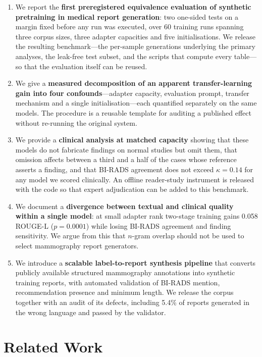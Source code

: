 \documentclass{wlscirep}
\begin{document}
\begin{enumerate}
  \item We report the \textbf{first preregistered equivalence evaluation of synthetic pretraining in medical report generation}: two one-sided tests on a margin fixed before any run was executed, over 60 training runs spanning three corpus sizes, three adapter capacities and five initialisations. We release the resulting benchmark---the per-sample generations underlying the primary analyses, the leak-free test subset, and the scripts that compute every table---so that the evaluation itself can be reused.
  \item We give a \textbf{measured decomposition of an apparent transfer-learning gain into four confounds}---adapter capacity, evaluation prompt, transfer mechanism and a single initialisation---each quantified separately on the same models. The procedure is a reusable template for auditing a published effect without re-running the original system.
  \item We provide a \textbf{clinical analysis at matched capacity} showing that these models do not fabricate findings on normal studies but omit them, that omission affects between a third and a half of the cases whose reference asserts a finding, and that BI-RADS agreement does not exceed $\kappa = 0.14$ for any model we scored clinically. An offline reader-study instrument is released with the code so that expert adjudication can be added to this benchmark.
  \item We document a \textbf{divergence between textual and clinical quality within a single model}: at small adapter rank two-stage training gains 0.058 ROUGE-L ($p=0.0001$) while losing BI-RADS agreement and finding sensitivity. We argue from this that $n$-gram overlap should not be used to select mammography report generators.
  \item We introduce a \textbf{scalable label-to-report synthesis pipeline} that converts publicly available structured mammography annotations into synthetic training reports, with automated validation of BI-RADS mention, recommendation presence and minimum length. We release the corpus together with an audit of its defects, including 5.4\% of reports generated in the wrong language and passed by the validator.
\end{enumerate}

\section*{Related Work}
\end{document}
